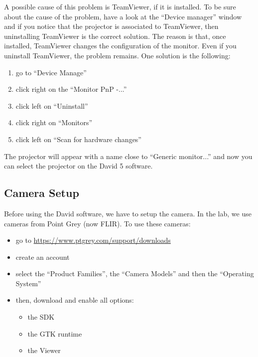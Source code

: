 \documentclass[11pt]{article}
\begin{document}
A possible cause of this problem is TeamViewer, if it is installed.
To be sure about the cause of the problem, have a look at the ``Device manager'' window and if you notice that the projector is associated to TeamViewer, then uninstalling TeamViewer is the correct solution.
The reason is that, once installed, TeamViewer changes the configuration of the monitor.
Even if you uninstall TeamViewer, the problem remains.
One solution is the following:
\begin{enumerate}
\item go to ``Device Manage''
\item click right on the ``Monitor PnP -...''
\item click left on ``Uninstall''
\item click right on ``Monitors''
\item click left on ``Scan for hardware changes''
\end{enumerate}
The projector will appear with a name close to ``Generic monitor...'' and now you can select the projector on the David 5 software.


\subsection{Camera Setup}
Before using the David software, we have to setup the camera.
In the lab, we use cameras from Point Grey (now FLIR).
To use these cameras:
\begin{itemize}
\item go to \url{https://www.ptgrey.com/support/downloads}
\item create an account
\item select the ``Product Families'', the ``Camera Models'' and then the ``Operating System''
\item then, download and enable all options:
\begin{itemize}
\item the SDK
\item the GTK runtime
\item the Viewer
\end{itemize}
\end{itemize}
\end{document}
